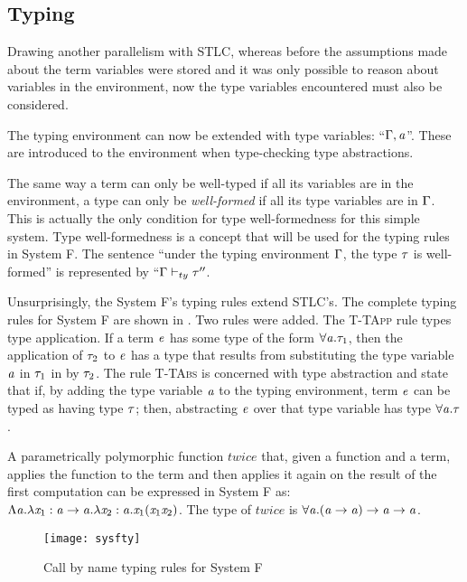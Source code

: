 \subsection{Typing}
Drawing another parallelism with STLC, whereas before the assumptions made about the term variables were stored and it was only possible to reason about variables in the environment, now the type variables encountered must also be considered.

The typing environment can now be extended with type variables: ``$\Gamma,\mathit{a}$''. These are introduced to the environment when type-checking type abstractions.

The same way a term can only be well-typed if all its variables are in the environment, a type can only be \textit{well-formed} if all its type variables are in $\Gamma$. This is actually the only condition for type well-formedness for this simple system. Type well-formedness is a concept that will be used for the typing rules in System F. The sentence ``under the typing environment $\Gamma$, the type $\mathit{\tau}$ is well-formed'' is represented by ``$\Gamma \vdash_{ty} \mathit{\tau}''$.

Unsurprisingly, the System F's typing rules extend STLC's. The complete typing rules for System F are shown in . Two rules were added. The \textsc{T-TApp} rule types type application. If a term $\mathit{e}$ has some type of the form $\forall {\mathit{a}} . {\mathit{\tau}_1}$, then the application of $\mathit{\tau}_2$ to $\mathit{e}$ has a type that results from substituting the type variable $\mathit{a}$ in $\mathit{\tau}_1$ in by $\mathit{\tau}_2$. The rule \textsc{T-TAbs} is concerned with type abstraction and state that if, by adding the type variable $\mathit{a}$ to the typing environment, term $\mathit{e}$ can be typed as having type $\mathit{\tau}$; then, abstracting $\mathit{e}$ over that type variable has type $\forall {\mathit{a}} . {\mathit{\tau}}$.

A parametrically polymorphic function $twice$ that, given a function and a term, applies the function to the term and then applies it again on the result of the first computation can be expressed in System F as: $\Lambda \mathit{a}. \lambda \mathit{x}_1: \mathit{a} \rightarrow \mathit{a} . \lambda \mathit{x}_2:\mathit{a}. \mathit{x}_1 (\mathit{x}_1 \mathit{x}_2)$. The type of $twice$ is $\forall {\mathit{a}} . {(\mathit{a} \rightarrow \mathit{a}) \rightarrow \mathit{a} \rightarrow \mathit{a}}$.

\begin{figure}
  \centering
  \texttt{[image: sysfty]}
  \caption{Call by name typing rules for System F}
  \label{sysfty}
\end{figure}
